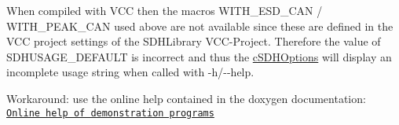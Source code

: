 
\begin{DoxyRefList}
\item[\label{bug__bug000001}%
\hypertarget{bug__bug000001}{}%
\-Member \hyperlink{sdhoptions_8h_a90372ef85e86e456fa18741a81f9b81d}{\-S\-D\-H\-U\-S\-A\-G\-E\-\_\-\-D\-E\-F\-A\-U\-L\-T} ]\-When compiled with \-V\-C\-C then the macros \-W\-I\-T\-H\-\_\-\-E\-S\-D\-\_\-\-C\-A\-N / \-W\-I\-T\-H\-\_\-\-P\-E\-A\-K\-\_\-\-C\-A\-N used above are not available since these are defined in the \-V\-C\-C project settings of the \-S\-D\-H\-Library \-V\-C\-C-\/\-Project. \-Therefore the value of \-S\-D\-H\-U\-S\-A\-G\-E\-\_\-\-D\-E\-F\-A\-U\-L\-T is incorrect and thus the \hyperlink{classcSDHOptions}{c\-S\-D\-H\-Options} will display an incomplete usage string when called with -\/h/-\/-\/help.\par
 \-Workaround\-: use the online help contained in the doxygen documentation\-: \href{./group__sdh__library__cpp__onlinehelp__group.html}{\tt \-Online help of demonstration programs} 
\end{DoxyRefList}
